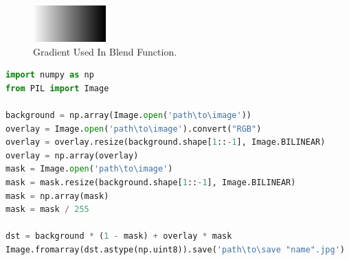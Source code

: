 \documentclass[%
]{USN-MSc}
\begin{document}
\begin{figure}[H]
  \centering
  \includegraphics[width=0.25\textwidth]{fig/gradation_h.jpg}
  \caption{Gradient Used In Blend Function.}
  \label{fig:Gradient}
\end{figure}


\begin{lstlisting}[language=Python, caption=Image Blending., label={lst:Image Blending}]
import numpy as np
from PIL import Image

background = np.array(Image.open('path\to\image'))
overlay = Image.open('path\to\image').convert("RGB")
overlay = overlay.resize(background.shape[1::-1], Image.BILINEAR)
overlay = np.array(overlay)
mask = Image.open('path\to\image')
mask = mask.resize(background.shape[1::-1], Image.BILINEAR)
mask = np.array(mask)
mask = mask / 255

dst = background * (1 - mask) + overlay * mask
Image.fromarray(dst.astype(np.uint8)).save('path\to\save "name".jpg')

\end{lstlisting}
\end{document}
